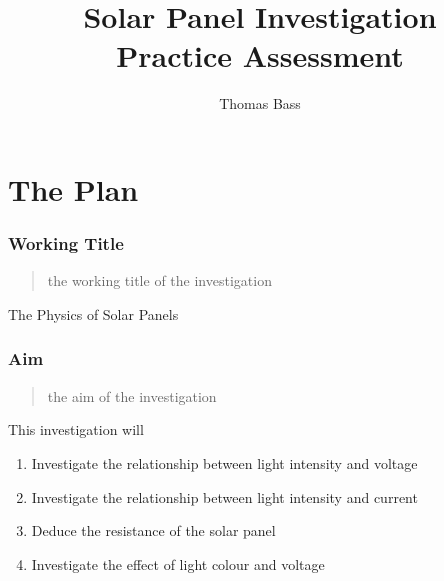\documentclass{article}
\title{Solar Panel Investigation \\ Practice Assessment}
\author{Thomas Bass}
\begin{document}
\maketitle


\part{The Plan}

\section{Working Title}
\begin{quote}
the working title of the investigation
\end{quote}
The Physics of Solar Panels

\section{Aim}
\begin{quote}
the aim of the investigation
\end{quote}
This investigation will
\begin{enumerate}
  \item Investigate the relationship between light intensity and voltage
  \item Investigate the relationship between light intensity and current
  \item Deduce the resistance of the solar panel
  \item Investigate the effect of light colour and voltage
\end{enumerate}
\end{document}

